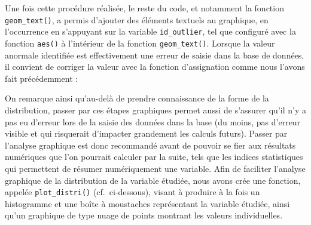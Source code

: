 \documentclass[
  french,
]{book}
\newenvironment{Shaded}{\begin{snugshade}}{\end{snugshade}}
\newcommand{\CommentTok}[1]{\textcolor[rgb]{0.56,0.35,0.01}{\textit{#1}}}
\newcommand{\DecValTok}[1]{\textcolor[rgb]{0.00,0.00,0.81}{#1}}
\newcommand{\FloatTok}[1]{\textcolor[rgb]{0.00,0.00,0.81}{#1}}
\newcommand{\NormalTok}[1]{#1}
\newcommand{\OperatorTok}[1]{\textcolor[rgb]{0.81,0.36,0.00}{\textbf{#1}}}
\newcommand{\StringTok}[1]{\textcolor[rgb]{0.31,0.60,0.02}{#1}}
\begin{document}
Une fois cette procédure réalisée, le reste du code, et notamment la fonction \texttt{geom\_text()}, a permis d'ajouter des éléments textuels au graphique, en l'occurrence en s'appuyant sur la variable \texttt{id\_outlier}, tel que configuré avec la fonction \texttt{aes()} à l'intérieur de la fonction \texttt{geom\_text()}. Lorsque la valeur anormale identifiée est effectivement une erreur de saisie dans la base de données, il convient de corriger la valeur avec la fonction d'assignation comme nous l'avons fait précédemment :

\begin{Shaded}
\end{Shaded}

On remarque ainsi qu'au-delà de prendre connaissance de la forme de la distribution, passer par ces étapes graphiques permet aussi de s'assurer qu'il n'y a pas eu d'erreur lors de la saisie des données dans la base (du moins, pas d'erreur visible et qui risquerait d'impacter grandement les calculs futurs). Passer par l'analyse graphique est donc recommandé avant de pouvoir se fier aux résultats numériques que l'on pourrait calculer par la suite, tels que les indices statistiques qui permettent de résumer numériquement une variable. Afin de faciliter l'analyse graphique de la distribution de la variable étudiée, nous avons crée une fonction, appelée \texttt{plot\_distri()} (cf.~ci-dessous), visant à produire à la fois un histogramme et une boîte à moustaches représentant la variable étudiée, ainsi qu'un graphique de type nuage de points montrant les valeurs individuelles.
\end{document}
